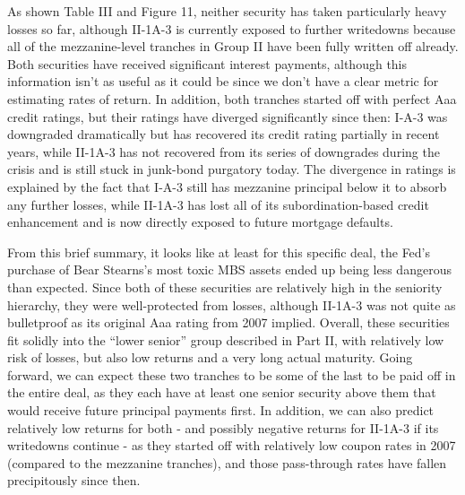 \documentclass[12pt]{article}
\begin{document}
As shown Table III and Figure 11, neither security has taken particularly heavy losses so far, although II-1A-3 is currently exposed to further writedowns because all of the mezzanine-level tranches in Group II have been fully written off already. Both securities have received significant interest payments, although this information isn’t as useful as it could be since we don’t have a clear metric for estimating rates of return. In addition, both tranches started off with perfect Aaa credit ratings, but their ratings have diverged significantly since then: I-A-3 was downgraded dramatically but has recovered its credit rating partially in recent years, while II-1A-3 has not recovered from its series of downgrades during the crisis and is still stuck in junk-bond purgatory today. The divergence in ratings is explained by the fact that I-A-3 still has mezzanine principal below it to absorb any further losses, while II-1A-3 has lost all of its subordination-based credit enhancement and is now directly exposed to future mortgage defaults.

From this brief summary, it looks like at least for this specific deal, the Fed’s purchase of Bear Stearns’s most toxic MBS assets ended up being less dangerous than expected. Since both of these securities are relatively high in the seniority hierarchy, they were well-protected from losses, although II-1A-3 was not quite as bulletproof as its original Aaa rating from 2007 implied. Overall, these securities fit solidly into the “lower senior” group described in Part II, with relatively low risk of losses, but also low returns and a very long actual maturity. Going forward, we can expect these two tranches to be some of the last to be paid off in the entire deal, as they each have at least one senior security above them that would receive future principal payments first. In addition, we can also predict relatively low returns for both - and possibly negative returns for II-1A-3 if its writedowns continue - as they started off with relatively low coupon rates in 2007 (compared to the mezzanine tranches), and those pass-through rates have fallen precipitously since then.
\end{document}
